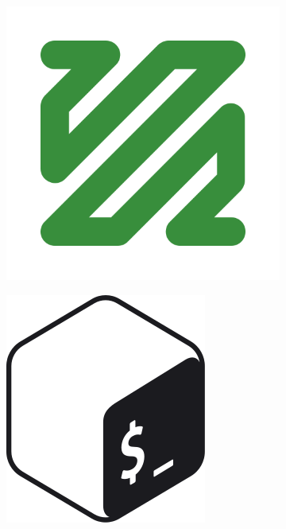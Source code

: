 \begin{figure}[h!]
  \par\vspace{1em} %

  \begin{subfigure}[b]{0.1\textwidth}
    \includegraphics[width=\textwidth]{Images/ffmpeg.png}
    \label{fig:ffmpeg}
  \end{subfigure}
  \hfill
  \begin{subfigure}[b]{0.1\textwidth}
    \includegraphics[width=\textwidth]{Images/bash.png}

\end{subfigure}
\end{figure}
